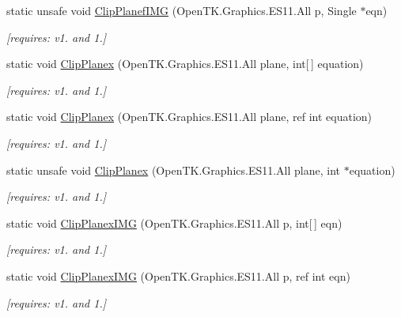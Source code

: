 \begin{DoxyCompactItemize}
static unsafe void \hyperlink{class_open_t_k_1_1_graphics_1_1_e_s11_1_1_g_l_aee854dd51ff45afbc31d02af4ed48ddb}{Clip\-Planef\-I\-M\-G} (Open\-T\-K.\-Graphics.\-E\-S11.\-All p, Single $\ast$eqn)
\begin{DoxyCompactList}\small\item\em \mbox{[}requires\-: v1. and 1.\mbox{]}\end{DoxyCompactList}\item 
static void \hyperlink{class_open_t_k_1_1_graphics_1_1_e_s11_1_1_g_l_a04d5d184a2c0a2d5b6fa89d6c4458d87}{Clip\-Planex} (Open\-T\-K.\-Graphics.\-E\-S11.\-All plane, int\mbox{[}$\,$\mbox{]} equation)
\begin{DoxyCompactList}\small\item\em \mbox{[}requires\-: v1. and 1.\mbox{]}\end{DoxyCompactList}\item 
static void \hyperlink{class_open_t_k_1_1_graphics_1_1_e_s11_1_1_g_l_ac4280c897fa8bd59c181944662648a84}{Clip\-Planex} (Open\-T\-K.\-Graphics.\-E\-S11.\-All plane, ref int equation)
\begin{DoxyCompactList}\small\item\em \mbox{[}requires\-: v1. and 1.\mbox{]}\end{DoxyCompactList}\item 
static unsafe void \hyperlink{class_open_t_k_1_1_graphics_1_1_e_s11_1_1_g_l_ab237f4fc9ea2d8a0160d46a7a4ccf4bf}{Clip\-Planex} (Open\-T\-K.\-Graphics.\-E\-S11.\-All plane, int $\ast$equation)
\begin{DoxyCompactList}\small\item\em \mbox{[}requires\-: v1. and 1.\mbox{]}\end{DoxyCompactList}\item 
static void \hyperlink{class_open_t_k_1_1_graphics_1_1_e_s11_1_1_g_l_ace30ddd58b4fb2c8ffcd1aae20734650}{Clip\-Planex\-I\-M\-G} (Open\-T\-K.\-Graphics.\-E\-S11.\-All p, int\mbox{[}$\,$\mbox{]} eqn)
\begin{DoxyCompactList}\small\item\em \mbox{[}requires\-: v1. and 1.\mbox{]}\end{DoxyCompactList}\item 
static void \hyperlink{class_open_t_k_1_1_graphics_1_1_e_s11_1_1_g_l_a9ca3413881dd669a9d754459bf59fb13}{Clip\-Planex\-I\-M\-G} (Open\-T\-K.\-Graphics.\-E\-S11.\-All p, ref int eqn)
\begin{DoxyCompactList}\small\item\em \mbox{[}requires\-: v1. and 1.\mbox{]}\end{DoxyCompactList}\item 

\end{DoxyCompactItemize}
